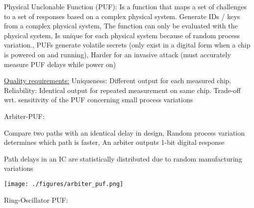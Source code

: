 \documentclass[landscape, a4paper]{article}
\begin{document}
\begin{minipage}[t]{0.2\linewidth}
\begin{betterlist}
\begin{betterlist}
\begin{betterlist}
\begin{betterlist}
					\begin{betterlist}
						\item \alert{Physical Unclonable Function (PUF):} Is a function that maps a set of challenges to a set of responses based on a complex physical system.  Generate IDs / keys from a complex physical system, The function can only be evaluated with the physical system, Is unique for each physical system because of random process variation., PUFs generate volatile secrets (only exist in a digital form when a chip is powered on and running), Harder for an invasive attack (must accurately measure PUF delays while power on)
						\item \underline{Quality requirements:} \alert{Uniqueness:} Different output for each measured chip. \alert{Reliability:} Identical output for repeated measurement on same chip. Trade-off wrt. sensitivity of the PUF concerning small process variations
						\item \alert{Arbiter-PUF:}
						\begin{betterlist}
							\item Compare two paths with an identical delay in design, Random process variation determines which path is faster, An arbiter outputs 1-bit digital response
							\item Path delays in an IC are statistically distributed due to random manufacturing variations
						\end{betterlist}

						\texttt{[image: ./figures/arbiter\_puf.png]}
						\item \alert{Ring-Oscillator PUF:}


\end{betterlist}
\end{betterlist}
\end{betterlist}
\end{betterlist}
\end{betterlist}
\end{minipage}
\end{document}
